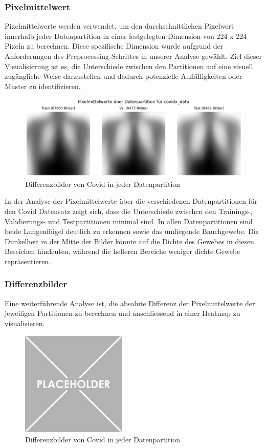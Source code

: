 \subsubsection{Pixelmittelwert} \label{chap:Pixelmittelwert-TestProblemEda2-covidx}

Pixelmittelwerte werden verwendet, um den durchschnittlichen Pixelwert innerhalb jeder Datenpartition in einer festgelegten Dimension von 224 x 224 Pixeln zu berechnen. Diese spezifische Dimension wurde aufgrund der Anforderungen des Preprocessing-Schrittes in unserer Analyse gewählt.  Ziel dieser Visualisierung ist es, die Unterschiede zwischen den Partitionen auf eine visuell zugängliche Weise darzustellen und dadurch potenzielle Auffälligkeiten oder Muster zu identifizieren.

\begin{figure}[ht]
    \centering
    \includegraphics[width=\linewidth]{01-images/03-data/covid-pixelmittelwerte.png}
    \caption{Differenzbilder von Covid in jeder Datenpartition}
    \label{fig:pixelmittelwert-datapartition-covid}
\end{figure}

In der Analyse der Pixelmittelwerte über die verschiedenen Datenpartitionen für den Covid Datensatz zeigt sich, dass die Unterschiede zwischen den Trainings-, Validierungs- und Testpartitionen minimal sind. In allen Datenpartitionen sind beide Lungenflügel deutlich zu erkennen sowie das umliegende Bauchgewebe. Die Dunkelheit in der Mitte der Bilder könnte auf die Dichte des Gewebes in diesen Bereichen hindeuten, während die helleren Bereiche weniger dichte Gewebe repräsentieren. 

\newpage

\subsubsection{Differenzbilder} \label{chap:Differenzenbilder-TestProblemEda2-covidx}

Eine weiterführende Analyse ist, die absolute Differenz der Pixelmittelwerte der jeweiligen Partitionen zu berechnen und anschliessend in einer Heatmap zu visualisieren.

\begin{figure}[ht]
    \centering
    \includegraphics[width=\linewidth, height=5cm]{01-images/01-setup/04-placeholder.png}
    \caption{Differenzbilder von Covid in jeder Datenpartition}
    \label{fig:differenz-datapartition-covid}
\end{figure}

\newpage